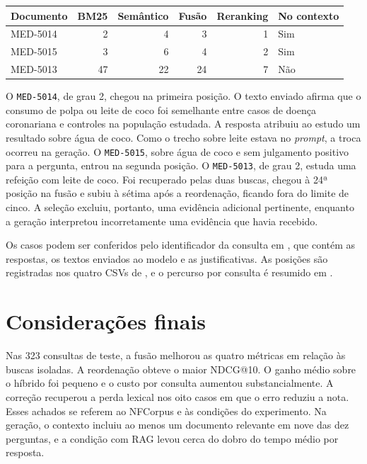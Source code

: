 \documentclass[12pt]{article}
\begin{document}
\noindent\begin{minipage}{\linewidth}
\centering
\small
{}
\label{tab:ranks-coco}
\begin{tabular}{@{}lrrrrl@{}}
\toprule
Documento & BM25 & Semântico & Fusão & Reranking & No contexto \\
\midrule
MED-5014 &  2 &  4 &  3 & 1 & Sim \\
MED-5015 &  3 &  6 &  4 & 2 & Sim \\
MED-5013 & 47 & 22 & 24 & 7 & Não \\
\bottomrule
\end{tabular}
\end{minipage}
\par\medskip

O \texttt{MED-5014}, de grau 2, chegou na primeira posição. O texto
enviado afirma que o consumo de polpa ou leite de coco foi semelhante
entre casos de doença coronariana e controles na população estudada.
A resposta atribuiu ao estudo um resultado sobre água de coco. Como o
trecho sobre leite estava no \textit{prompt}, a troca ocorreu na geração.
O \texttt{MED-5015}, sobre água de coco e sem julgamento positivo para a
pergunta, entrou na segunda posição. O \texttt{MED-5013}, de grau 2,
estuda uma refeição com leite de coco. Foi recuperado pelas duas buscas,
chegou à 24ª posição na fusão e subiu à sétima após a reordenação, ficando
fora do limite de cinco. A seleção excluiu, portanto, uma evidência
adicional pertinente, enquanto a geração interpretou incorretamente uma
evidência que havia recebido.

Os casos podem ser conferidos pelo identificador da consulta em
, que contém as respostas,
os textos enviados ao modelo e as justificativas. As posições são
registradas nos quatro CSVs de ,
e o percurso por consulta é resumido em
.

\section{Considerações finais}

Nas 323 consultas de teste, a fusão melhorou as quatro métricas em
relação às buscas isoladas. A reordenação obteve o maior NDCG@10.
O ganho médio sobre o híbrido foi pequeno e o custo por consulta
aumentou substancialmente.
A correção recuperou a perda lexical nos oito casos em que o erro
reduziu a nota. Esses achados se referem ao NFCorpus e às condições
do experimento. Na geração, o contexto incluiu ao menos um documento
relevante em nove das dez perguntas, e a condição com RAG levou cerca
do dobro do tempo médio por resposta.
\end{document}
